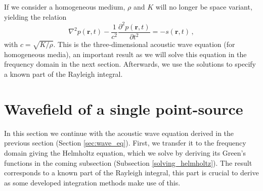 If we consider a homogeneous medium, $\rho$ and $K$ will no longer be space variant, yielding the relation
\begin{equation}
    \nabla^2 p (\mathbf r, t) - \frac{1}{c^2} \frac{\partial^2 p (\mathbf r, t)}{\partial t^2} = -s(\mathbf r, t) \,,\label{eq:helmholtz}
\end{equation}
with $c = \sqrt{K/\rho}$.
This is the three-dimensional acoustic wave equation (for homogeneous media), an important result as we will solve this equation in the frequency domain in the next section. Afterwards, we use the solutions to specify a known part of the Rayleigh integral.

\section{Wavefield of a single point-source}
In this section we continue with the acoustic wave equation derived in the previous section (Section \ref{sec:wave_eq}).
First, we transfer it to the frequency domain giving the Helmholtz equation, which we solve by deriving its Green's functions in the coming subsection (Subsection \ref{solving_helmholtz}).
The result corresponds to a known part of the Rayleigh integral, this part is crucial to derive as some developed integration methods make use of this.

